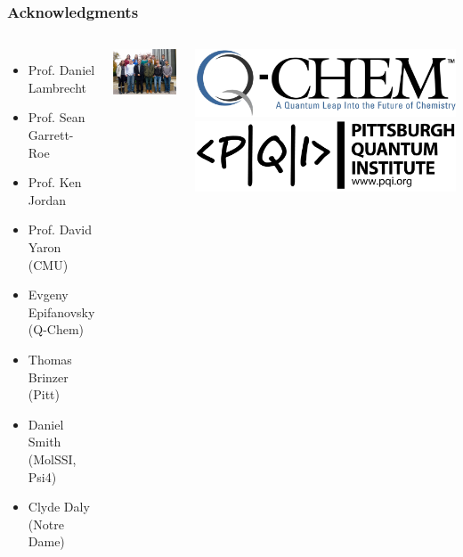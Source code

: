 \documentclass[%
    xcolor=usenames,dvipsnames,svgnames%
]{beamer}
\begin{document}
\begin{frame}
  \frametitle{Acknowledgments}
  \begin{columns}
    \begin{minipage}{1.0\linewidth}
      \scriptsize
      \begin{itemize}
      \item Prof. Daniel Lambrecht
      \item Prof. Sean Garrett-Roe
      \item Prof. Ken Jordan
      \item Prof. David Yaron (CMU)
      \item Evgeny Epifanovsky (Q-Chem)
      \item Thomas Brinzer (Pitt)
      \item Daniel Smith (MolSSI, Psi4)
      \item Clyde Daly (Notre Dame)
      \end{itemize}
      \includegraphics[scale=0.38]{./figures/lambrecht_group.png}
    \end{minipage}
    \begin{minipage}{1.0\linewidth}
      \centering
      \includegraphics[width=1.00\linewidth,keepaspectratio]{./figures/Qchem-logo.png}
      \includegraphics[width=0.90\linewidth,keepaspectratio]{./figures/PQI-Letter-Logo-black.png}

\end{minipage}
\end{columns}
\end{frame}
\end{document}
